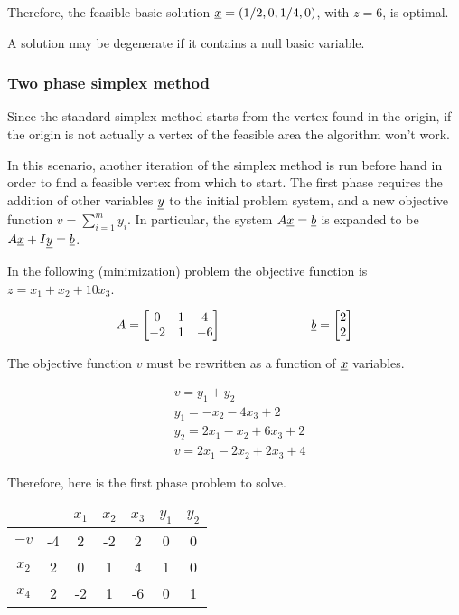Therefore, the feasible basic solution $\underline{x} = (1/2, 0, 1/4, 0)$, with $z = 6$, is optimal.

A solution may be degenerate if it contains a null basic variable.

\subsubsection{Two phase simplex method}

Since the standard simplex method starts from the vertex found in the origin, if the origin is not actually a vertex of the feasible area the algorithm won't work.

In this scenario, another iteration of the simplex method is run before hand in order to find a feasible vertex from which to start.
The first phase requires the addition of other variables $\underline{y}$ to the initial problem system, and a new objective function $v = \sum_{i=1}^m y_i$.
In particular, the system $A \underline{x} = \underline{b}$ is expanded to be $A \underline{x} + I \underline{y} = \underline{b}$.

In the following (minimization) problem the objective function is $z = x_1 + x_2 + 10 x_3$.

$$
A=
\begin{bmatrix}
    0 & 1 & 4 \\
    -2 & 1 & -6
\end{bmatrix}
\hspace{2.5cm}
\underline{b}=
\begin{bmatrix}
    2 \\ 2
\end{bmatrix}
$$

The objective function $v$ must be rewritten as a function of $\underline{x}$ variables.

\begin{align*}
& v = y_1 + y_2 \\
& y_1 = - x_2 - 4 x_3 + 2 \\
& y_2 = 2 x_1 - x_2 + 6 x_3 + 2 \\
& v = 2 x_1 - 2 x_2 + 2 x_3 + 4
\end{align*}

Therefore, here is the first phase problem to solve.

\begin{center}
    \begin{tabular}{c|c|ccc|cc}
        & & $x_1$ & $x_2$ & $x_3$ & $y_1$ & $y_2$ \\ \hline
        $-v$ & -4 & 2 & -2 & 2 & 0 & 0 \\ \hline
        $x_2$ & 2 & 0 & 1 & 4 & 1 & 0 \\
        $x_4$ & 2 & -2 & 1 & -6 & 0 & 1
    \end{tabular}
\end{center}

